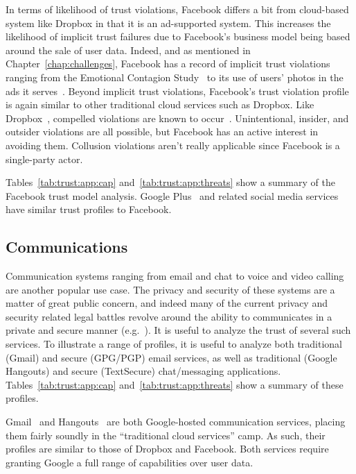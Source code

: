 In terms of likelihood of trust violations, Facebook differs a bit
from cloud-based system like Dropbox in that it is an ad-supported
system. This increases the likelihood of implicit trust failures due
to Facebook's business model being based around the sale of user
data. Indeed, and as mentioned in Chapter~\ref{chap:challenges},
Facebook has a record of implicit trust violations ranging from the
Emotional Contagion Study~\cite{goel2014} to its use of users' photos
in the ads it serves~\cite{mashable-socialads}. Beyond implicit trust
violations, Facebook's trust violation profile is again similar to
other traditional cloud services such as Dropbox. Like
Dropbox~\cite{dropbox-transparency}, compelled violations are known to
occur~\cite{facebook-transparency}. Unintentional, insider, and
outsider violations are all possible, but Facebook has an active
interest in avoiding them. Collusion violations aren't really
applicable since Facebook is a single-party actor.

Tables~\ref{tab:trust:app:cap} and~\ref{tab:trust:app:threats} show a
summary of the Facebook trust model analysis. Google
Plus~\cite{google-plus} and related social media services have similar
trust profiles to Facebook.

\subsection{Communications}

Communication systems ranging from email and chat to voice and video
calling are another popular use case. The privacy and security of
these systems are a matter of great public concern, and indeed many of
the current privacy and security related legal battles revolve around
the ability to communicates in a private and secure manner
(e.g.~\cite{apple-fbiletter, greenwald-prism, levsion-lavabit}). It is
useful to analyze the trust of several such services. To illustrate a
range of profiles, it is useful to analyze both traditional (Gmail)
and secure (GPG/PGP) email services, as well as traditional (Google
Hangouts) and secure (TextSecure) chat/messaging
applications. Tables~\ref{tab:trust:app:cap}
and~\ref{tab:trust:app:threats} show a summary of these profiles.

Gmail~\cite{google-gmail} and Hangouts~\cite{google-hangouts} are both
Google-hosted communication services, placing them fairly soundly in
the ``traditional cloud services'' camp. As such, their profiles are
similar to those of Dropbox and Facebook. Both services require
granting Google a full range of capabilities over user data.

